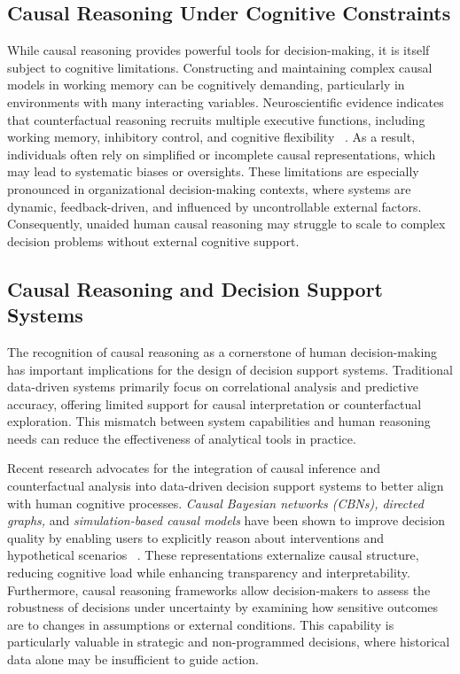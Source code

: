 \documentclass{sfuthesis}
\begin{document}
\subsection{Causal Reasoning Under Cognitive Constraints}
While causal reasoning provides powerful tools for decision-making, it is itself subject to cognitive limitations. Constructing and maintaining complex causal models in working memory can be cognitively demanding, particularly in environments with many interacting variables. Neuroscientific evidence indicates that counterfactual reasoning recruits multiple executive functions, including working memory, inhibitory control, and cognitive flexibility ~\cite{van_hoeck_cognitive_2015}. As a result, individuals often rely on simplified or incomplete causal representations, which may lead to systematic biases or oversights. These limitations are especially pronounced in organizational decision-making contexts, where systems are dynamic, feedback-driven, and influenced by uncontrollable external factors. Consequently, unaided human causal reasoning may struggle to scale to complex decision problems without external cognitive support.
\subsection{Causal Reasoning and Decision Support Systems}
The recognition of causal reasoning as a cornerstone of human decision-making has important implications for the design of decision support systems. Traditional data-driven systems primarily focus on correlational analysis and predictive accuracy, offering limited support for causal interpretation or counterfactual exploration. This mismatch between system capabilities and human reasoning needs can reduce the effectiveness of analytical tools in practice.\par
Recent research advocates for the integration of causal inference and counterfactual analysis into data-driven decision support systems to better align with human cognitive processes. \textit{Causal Bayesian networks (CBNs), directed graphs, }and\textit{ simulation-based causal models} have been shown to improve decision quality by enabling users to explicitly reason about interventions and hypothetical scenarios ~\cite{jeunen_consequencescausality_2022, kyrimi_counterfactual_2025}. These representations externalize causal structure, reducing cognitive load while enhancing transparency and interpretability. Furthermore, causal reasoning frameworks allow decision-makers to assess the robustness of decisions under uncertainty by examining how sensitive outcomes are to changes in assumptions or external conditions. This capability is particularly valuable in strategic and non-programmed decisions, where historical data alone may be insufficient to guide action.
\end{document}
